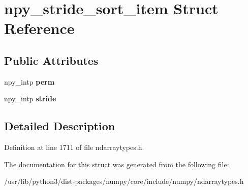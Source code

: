 \hypertarget{structnpy__stride__sort__item}{}\section{npy\+\_\+stride\+\_\+sort\+\_\+item Struct Reference}
\label{structnpy__stride__sort__item}
\subsection*{Public Attributes}
\begin{DoxyCompactItemize}
\item 
npy\+\_\+intp {\bfseries perm}\hypertarget{structnpy__stride__sort__item_a62c4593e1cdf5936819b24eab2326162}{}\label{structnpy__stride__sort__item_a62c4593e1cdf5936819b24eab2326162}

\item 
npy\+\_\+intp {\bfseries stride}\hypertarget{structnpy__stride__sort__item_a58b3a74b21f36004832323552caa0e00}{}\label{structnpy__stride__sort__item_a58b3a74b21f36004832323552caa0e00}

\end{DoxyCompactItemize}


\subsection{Detailed Description}


Definition at line 1711 of file ndarraytypes.\+h.



The documentation for this struct was generated from the following file\+:\begin{DoxyCompactItemize}
\item 
/usr/lib/python3/dist-\/packages/numpy/core/include/numpy/ndarraytypes.\+h\end{DoxyCompactItemize}

